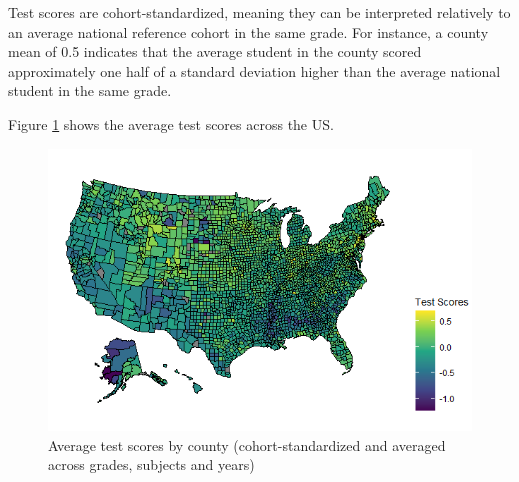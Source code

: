Test scores are cohort-standardized, meaning they can be interpreted relatively to an average national reference cohort in the same grade. For instance, a county mean of 0.5 indicates that the average student in the county scored approximately one half of a standard deviation higher than the average national student in the same grade.

Figure \ref{TestScoresMap} shows the average test scores across the US.


\begin{figure}[!h]
	\centering
	\includegraphics[scale=0.7]{"../Code & Data/TestScoresMap.png"}
	\caption{Average test scores by county (cohort-standardized and averaged across grades, subjects and years)}
	\label{TestScoresMap}
\end{figure}

